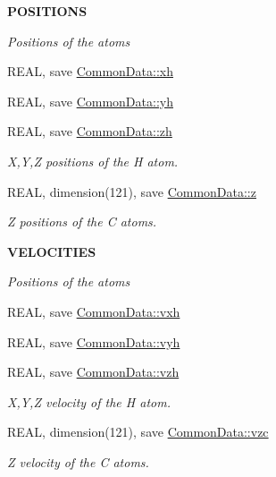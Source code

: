 \begin{Indent}{\bf POSITIONS}\par
{\em \label{_amgrpf3624ebc73536284b7104d42ac395766}
Positions of the atoms }\begin{DoxyCompactItemize}
\item 
REAL, save \hyperlink{namespace_common_data_a54cf378ece8175fe01e142e009cefd6a}{CommonData::xh}
\item 
REAL, save \hyperlink{namespace_common_data_aefaa9a9c076fac8257c87df0ac2c3f08}{CommonData::yh}
\item 
REAL, save \hyperlink{namespace_common_data_af47bf8216990a30ef0b9c34a3259fa83}{CommonData::zh}
\begin{DoxyCompactList}\small\item\em X,Y,Z positions of the H atom. \item\end{DoxyCompactList}\item 
REAL, dimension(121), save \hyperlink{namespace_common_data_a449fb6ff43ccc84909d922ac55097b87}{CommonData::z}
\begin{DoxyCompactList}\small\item\em Z positions of the C atoms. \item\end{DoxyCompactList}\end{DoxyCompactItemize}
\end{Indent}
\begin{Indent}{\bf VELOCITIES}\par
{\em \label{_amgrp37fcd1f52db2b7fae70aa3f5dfc8df0b}
Positions of the atoms }\begin{DoxyCompactItemize}
\item 
REAL, save \hyperlink{namespace_common_data_a82357dbd5bbd2700a2a5ee66874b8e43}{CommonData::vxh}
\item 
REAL, save \hyperlink{namespace_common_data_aabc4c29fca54ecb40e7edb7253d05f30}{CommonData::vyh}
\item 
REAL, save \hyperlink{namespace_common_data_a0d934df8fa7969c9e8b25f8338b68bb7}{CommonData::vzh}
\begin{DoxyCompactList}\small\item\em X,Y,Z velocity of the H atom. \item\end{DoxyCompactList}\item 
REAL, dimension(121), save \hyperlink{namespace_common_data_ac22677afeff86b9a93bcbb4447a213aa}{CommonData::vzc}
\begin{DoxyCompactList}\small\item\em Z velocity of the C atoms. \item\end{DoxyCompactList}\end{DoxyCompactItemize}
\end{Indent}
